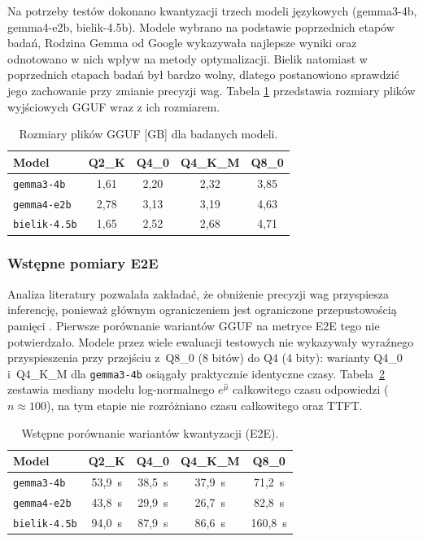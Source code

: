 Na potrzeby testów dokonano kwantyzacji trzech modeli językowych (gemma3-4b, gemma4-e2b, bielik-4.5b). Modele wybrano na podstawie poprzednich etapów badań, Rodzina Gemma od Google wykazywała najlepsze wyniki oraz odnotowano w nich wpływ na metody optymalizacji. Bielik natomiast w poprzednich etapach badań był bardzo wolny, dlatego postanowiono sprawdzić jego zachowanie przy zmianie precyzji wag. Tabela \ref{tab:gguf_rozmiary} przedstawia rozmiary plików wyjściowych GGUF wraz z ich rozmiarem.

\begin{table}[H]
  \centering
  \caption{Rozmiary plików GGUF [GB] dla badanych modeli.}
  \label{tab:gguf_rozmiary}
  \begin{tabular}{lcccc}
    \hline
    Model & Q2\_K & Q4\_0 & Q4\_K\_M & Q8\_0 \\
    \hline
    \texttt{gemma3-4b}   & 1{,}61 & 2{,}20 & 2{,}32 & 3{,}85 \\
    \texttt{gemma4-e2b}  & 2{,}78 & 3{,}13 & 3{,}19 & 4{,}63 \\
    \texttt{bielik-4.5b} & 1{,}65 & 2{,}52 & 2{,}68 & 4{,}71 \\
    \hline
  \end{tabular}
\end{table}

\subsubsection{Wstępne pomiary E2E}

Analiza literatury pozwalała zakładać, że obniżenie precyzji wag przyspiesza inferencję,
ponieważ głównym ograniczeniem jest ograniczone przepustowością pamięci
\cite{Kim2023SqueezeLLM}. Pierwsze porównanie wariantów GGUF na metryce E2E
tego nie potwierdzało. Modele przez wiele ewaluacji testowych nie wykazywały
wyraźnego przyspieszenia przy przejściu z~Q8\_0 (8 bitów) do Q4 (4 bity): warianty Q4\_0
i~Q4\_K\_M dla \texttt{gemma3-4b} osiągały praktycznie identyczne czasy.
Tabela~\ref{tab:e2e_wstepne} zestawia mediany modelu log-normalnego
$e^{\hat\mu}$ całkowitego czasu odpowiedzi ($n\approx 100$), na tym etapie nie rozróżniano czasu całkowitego oraz TTFT.

\begin{table}[H]
  \centering
  \caption{Wstępne porównanie wariantów kwantyzacji (E2E).}
  \label{tab:e2e_wstepne}
  \begin{tabular}{lcccc}
    \hline
    Model & Q2\_K & Q4\_0 & Q4\_K\_M & Q8\_0 \\
    \hline
    \texttt{gemma3-4b}   & 53{,}9~s & 38{,}5~s & 37{,}9~s & 71{,}2~s \\
    \texttt{gemma4-e2b}  & 43{,}8~s & 29{,}9~s & 26{,}7~s & 82{,}8~s \\
    \texttt{bielik-4.5b} & 94{,}0~s & 87{,}9~s & 86{,}6~s & 160{,}8~s \\
    \hline
  \end{tabular}
\end{table}

